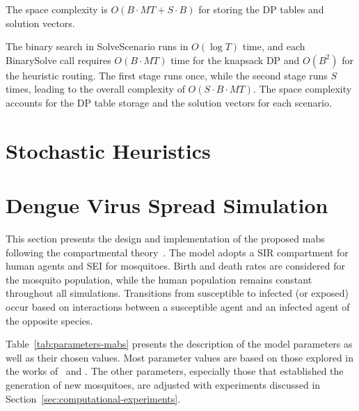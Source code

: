 The space complexity is $O(B \cdot MT + S \cdot B)$ for storing the DP tables and solution vectors.

The binary search in SolveScenario runs in $O(\log T)$ time, and each BinarySolve call
requires $O(B \cdot MT)$ time for the knapsack DP and $O(B^2)$ for the heuristic routing.
The first stage runs once, while the second stage runs $S$ times, leading to the overall
complexity of $O(S \cdot B \cdot MT)$. The space complexity accounts for the DP table
storage and the solution vectors for each scenario.


\section{Stochastic Heuristics}\label{sec:stochastic-heuristics}

\section{Dengue Virus Spread Simulation}\label{sec:dengue-virus-spread-simulation}

This section presents the design and implementation of the proposed \gls{mabs}
following the compartmental theory~\citep{amaku:2014}. The model adopts a SIR
compartment for human agents and SEI for mosquitoes. Birth and death rates are
considered for the mosquito population, while the human population remains
constant throughout all simulations. Transitions from susceptible to infected
(or exposed) occur based on interactions between a susceptible agent and an
infected agent of the opposite species.

Table~\ref{tab:parameters-mabs} presents the description of the model parameters
as well as their chosen values. Most parameter values are based on those
explored in the works of~\cite{da-silva:2020} and \cite{dwivedi:2022}. The other
parameters, especially those that established the generation of new mosquitoes,
are adjusted with experiments discussed in
Section~\ref{sec:computational-experiments}.

